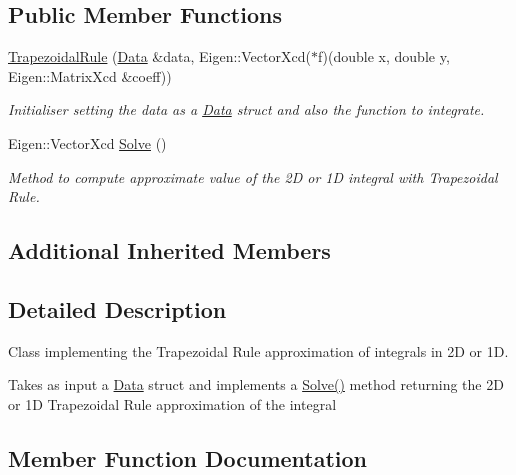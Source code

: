 \subsection*{Public Member Functions}
\begin{DoxyCompactItemize}
\item 
\mbox{\label{class_trapezoidal_rule_a950f29db214b348a6dd9c03bf05fadac}} 
\hyperlink{class_trapezoidal_rule_a950f29db214b348a6dd9c03bf05fadac}{Trapezoidal\+Rule} (\hyperlink{struct_data}{Data} \&data, Eigen\+::\+Vector\+Xcd($\ast$f)(double x, double y, Eigen\+::\+Matrix\+Xcd \&coeff))
\begin{DoxyCompactList}\small\item\em Initialiser setting the data as a \hyperlink{struct_data}{Data} struct and also the function to integrate. \end{DoxyCompactList}\item 
Eigen\+::\+Vector\+Xcd \hyperlink{class_trapezoidal_rule_ae822d86948bdc8876bf524cd620e11b8}{Solve} ()
\begin{DoxyCompactList}\small\item\em Method to compute approximate value of the 2D or 1D integral with Trapezoidal Rule. \end{DoxyCompactList}\end{DoxyCompactItemize}
\subsection*{Additional Inherited Members}


\subsection{Detailed Description}
Class implementing the Trapezoidal Rule approximation of integrals in 2D or 1D. 

Takes as input a \hyperlink{struct_data}{Data} struct and implements a \hyperlink{class_trapezoidal_rule_ae822d86948bdc8876bf524cd620e11b8}{Solve()} method returning the 2D or 1D Trapezoidal Rule approximation of the integral 

\subsection{Member Function Documentation}
\mbox{\label{class_trapezoidal_rule_ae822d86948bdc8876bf524cd620e11b8}} 
